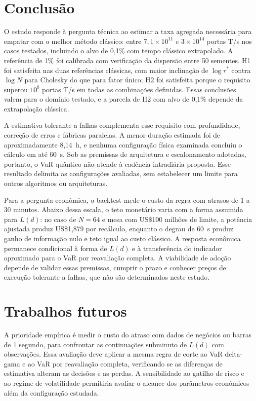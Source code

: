 \documentclass[conference,a4paper]{IEEEtran}
\begin{document}
\section{Conclusão}\label{conclusuxe3o}

O estudo responde à pergunta técnica ao estimar a taxa agregada necessária para empatar com o melhor método clássico: entre \(7{,}1\times10^{11}\) e \(3\times10^{14}\) portas T/s nos casos testados, incluindo o alvo de 0,1\% com tempo clássico extrapolado. A referência de 1\% foi calibrada com verificação da dispersão entre 50 sementes. H1 foi satisfeita nas duas referências clássicas, com maior inclinação de \(\log r^*\) contra \(\log N\) para Cholesky do que para fator único; H2 foi satisfeita porque o requisito superou \(10^8\) portas T/s em todas as combinações definidas. Essas conclusões valem para o domínio testado, e a parcela de H2 com alvo de 0,1\% depende da extrapolação clássica.

A estimativa tolerante a falhas complementa esse requisito com profundidade, correção de erros e fábricas paralelas. A menor duração estimada foi de aproximadamente 8,14~h, e nenhuma configuração física examinada concluiu o cálculo em até 60~s. Sob as premissas de arquitetura e escalonamento adotadas, portanto, o VaR quântico não atende à cadência intradiária proposta. Esse resultado delimita as configurações avaliadas, sem estabelecer um limite para outros algoritmos ou arquiteturas.

Para a pergunta econômica, o backtest mede o custo da regra com atrasos de 1 a 30 minutos. Abaixo dessa escala, o teto monetário varia com a forma assumida para \(L(d)\): no caso de \(N=64\) e mesa com US\$100 milhões de limite, a potência ajustada produz US\$1,879 por recálculo, enquanto o degrau de 60~s produz ganho de informação nulo e teto igual ao custo clássico. A resposta econômica permanece condicional à forma de \(L(d)\) e à transferência do indicador aproximado para o VaR por reavaliação completa. A viabilidade de adoção depende de validar essas premissas, cumprir o prazo e conhecer preços de execução tolerante a falhas, que não são determinados neste estudo.

\section{Trabalhos futuros}\label{trabalhos-futuros}

A prioridade empírica é medir o custo do atraso com dados de negócios ou barras de 1 segundo, para confrontar as continuações subminuto de \(L(d)\) com observações. Essa avaliação deve aplicar a mesma regra de corte ao VaR delta-gama e ao VaR por reavaliação completa, verificando se as diferenças de estimativa alteram as decisões e as perdas. A sensibilidade ao gatilho de risco e ao regime de volatilidade permitiria avaliar o alcance dos parâmetros econômicos além da configuração estudada.
\end{document}
